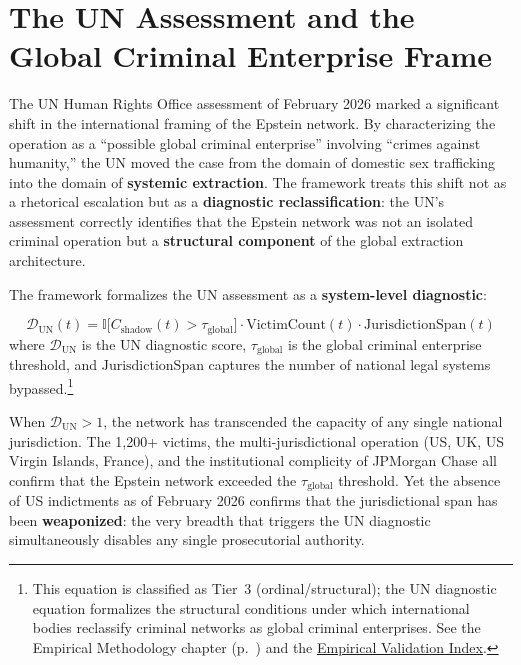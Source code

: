 \section{The UN Assessment and the Global Criminal Enterprise Frame}

The UN Human Rights Office assessment of February 2026 marked a significant shift in the international framing of the Epstein network. By characterizing the operation as a ``possible global criminal enterprise'' involving ``crimes against humanity,'' the UN moved the case from the domain of domestic sex trafficking into the domain of \textbf{systemic extraction}. The framework treats this shift not as a rhetorical escalation but as a \textbf{diagnostic reclassification}: the UN's assessment correctly identifies that the Epstein network was not an isolated criminal operation but a \textbf{structural component} of the global extraction architecture.

The framework formalizes the UN assessment as a \textbf{system-level diagnostic}:

\begin{equation}\label{eq:gp15b-un-diagnostic-2}
\mathcal{D}_{\text{UN}}(t) = \mathbb{I}\bigl[ C_{\text{shadow}}(t) > \tau_{\text{global}} \bigr] \cdot \text{VictimCount}(t) \cdot \text{JurisdictionSpan}(t)
\end{equation}
where $\mathcal{D}_{\text{UN}}$ is the UN diagnostic score, $\tau_{\text{global}}$ is the global criminal enterprise threshold, and $\text{JurisdictionSpan}$ captures the number of national legal systems bypassed.\footnote{This equation is classified as Tier~3 (ordinal/structural); the UN diagnostic equation formalizes the structural conditions under which international bodies reclassify criminal networks as global criminal enterprises. See the Empirical Methodology chapter (p.~\pageref{ch:empirical_methodology}) and the \hyperref[app:empirical_index]{Empirical Validation Index}.}

When $\mathcal{D}_{\text{UN}} > 1$, the network has transcended the capacity of any single national jurisdiction. The 1,200+ victims, the multi-jurisdictional operation (US, UK, US Virgin Islands, France), and the institutional complicity of JPMorgan Chase all confirm that the Epstein network exceeded the $\tau_{\text{global}}$ threshold. Yet the absence of US indictments as of February 2026 confirms that the jurisdictional span has been \textbf{weaponized}: the very breadth that triggers the UN diagnostic simultaneously disables any single prosecutorial authority.


